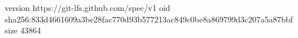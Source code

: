 version https://git-lfs.github.com/spec/v1
oid sha256:833d4661609a3be28fac770d93b577213ac849c0be8a869799d3c207a5a87bbf
size 43864
